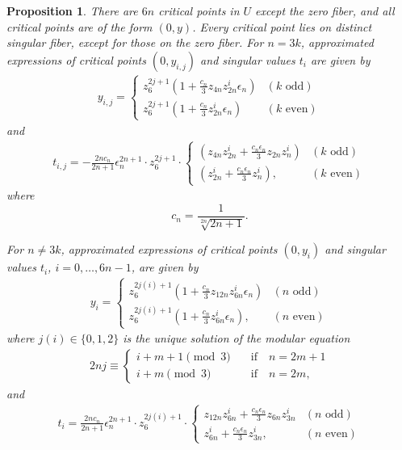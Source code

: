 \documentclass[10pt,a4paper,reqno]{amsart}
\newtheorem{prop}[thm]{Proposition}
\theoremstyle{definition}
\numberwithin{equation}{section}
\numberwithin{figure}{section}
\newcommand{\ep}{\epsilon}
\begin{document}
\begin{prop}
There are $6n$ critical points in $U$ except the zero fiber, and all critical points are of the form $(0,y)$.
Every critical point lies on distinct singular fiber, except for those on the zero fiber.
For $n=3k$, approximated expressions of critical points $(0,y_{i,j})$ and singular values $t_i$ are given by
    \begin{align}\label{eq:y_i,j, 3}
    y_{i,j}=
    \begin{cases} z_6^{2j+1} (1+\frac{c_n}{3} z_{4n} z_{2n}^i {\ep_n}) & (k \text{ odd}) \\ 
    z_6^{2j+1} (1+\frac{c_n}{3} z_{2n}^i {\ep_n}) & (k \text{ even})
    \end{cases}
    \end{align}
and
    \begin{align}\label{eq:t_i, 3}
    t_{i,j}= -\frac{2nc_n}{2n+1} {\ep_n^{2n+1}}\cdot z_6^{2j+1} \cdot 
    \begin{cases} (z_{4n}z_{2n}^i +\frac{c_n{\ep_n}}{3}  z_{2n}z_n^{i})& (k \text{ odd}) \\
    ( z_{2n}^i+\frac{c_n{\ep_n}}{3} z_n^{i}), &(k \text{ even}) \end{cases}
    \end{align}
where \[c_n=\frac{1}{\sqrt[2n]{2n+1}}.\]

For $n \neq 3k$, approximated expressions of critical points
$(0,y_i)$ and singular values $t_i$, $i=0,\dots, 6n-1$, are given by
\begin{align}
y_i=
\begin{cases}
z_6^{2j(i)+1}(1+\frac{c_n}{3} z_{12n} z_{6n}^i \ep_n )& (n \text{ odd}) \\
z_6^{2j(i)+1}(1+\frac{c_n}{3} z_{6n}^i \ep_n), & (n \text{ even}) 
\end{cases}
\end{align}
where $j(i)\in\{0,1,2\}$ is the unique solution of the modular equation
\begin{align} 
2nj \equiv \begin{cases} i+m+1 \pmod 3 & \quad \text{if}  \quad n=2m+1\\
 i+m \pmod 3 & \quad \text{if}  \quad n=2m, \end{cases}
\end{align}
and
\begin{align} \label{eq:t_i, 2}
t_i =\frac{2nc_n}{2n+1} {\ep_n^{2n+1}} \cdot z_6^{2j(i)+1}\cdot 
\begin{cases} z_{12n}z_{6n}^i +\frac{c_n{\ep_n}}{3}  z_{6n}z_{3n}^{i}& (n \text{ odd}) \\
 z_{6n}^i+\frac{c_n{\ep_n}}{3} z_{3n}^{i}, &(n \text{ even}) \end{cases}
\end{align}
\end{prop}
\end{document}

